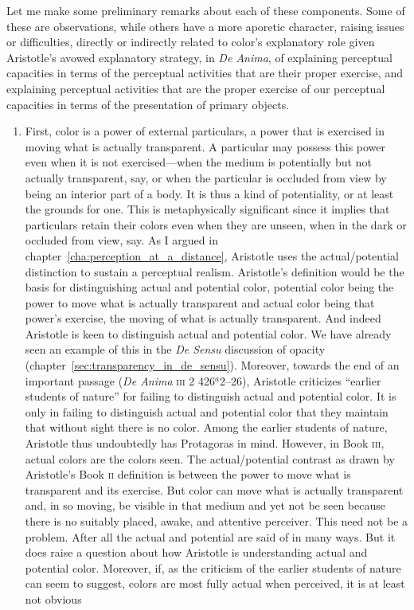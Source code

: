 Let me make some preliminary remarks about each of these components. Some of these are observations, while others have a more aporetic character, raising issues or difficulties, directly or indirectly related to color's explanatory role given Aristotle's avowed explanatory strategy, in \emph{De Anima}, of explaining perceptual capacities in terms of the perceptual activities that are their proper exercise, and explaining perceptual activities that are the proper exercise of our perceptual capacities in terms of the presentation of primary objects.
\begin{enumerate}[(1)]
	\item First, color is a power of external particulars, a power that is exercised in moving what is actually transparent. A particular may possess this power even when it is not exercised---when the medium is potentially but not actually transparent, say, or when the particular is occluded from view by being an interior part of a body. It is thus a kind of potentiality, or at least the grounds for one. This is metaphysically significant since it implies that particulars retain their colors even when they are unseen, when in the dark or occluded from view, say. As I argued in chapter~\ref{cha:perception_at_a_distance}, Aristotle uses the actual/potential distinction to sustain a perceptual realism. Aristotle's definition would be the basis for distinguishing actual and potential color, potential color being the power to move what is actually transparent and actual color being that power's exercise, the moving of what is actually transparent. And indeed Aristotle is keen to distinguish actual and potential color. We have already seen an example of this in the \emph{De Sensu} discussion of opacity (chapter~\ref{sec:transparency_in_de_sensu}). Moreover, towards the end of an important passage (\emph{De Anima} \textsc{iii} 2 426\( ^{a} \)2--26), Aristotle criticizes ``earlier students of nature'' for failing to distinguish actual and potential color. It is only in failing to distinguish actual and potential color that they maintain that without sight there is no color. Among the earlier students of nature, Aristotle thus undoubtedly has Protagoras in mind. However, in Book \textsc{iii}, actual colors are the colors seen. The actual/potential contrast as drawn by Aristotle's Book \textsc{ii} definition is between the power to move what is transparent and its exercise. But color can move what is actually transparent and, in so moving, be visible in that medium and yet not be seen because there is no suitably placed, awake, and attentive perceiver. This need not be a problem. After all the actual and potential are said of in many ways. But it does raise a question about how Aristotle is understanding actual and potential color. Moreover, if, as the criticism of the earlier students of nature can seem to suggest, colors are most fully actual when perceived, it is at least not obvious 
\end{enumerate}
